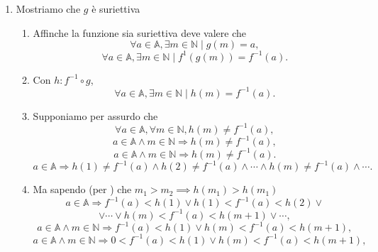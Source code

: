\begin{demonstration}
\begin{enumerate}[label=(\roman*)]
        \item Mostriamo che $g$ è suriettiva
        \begin{enumerate}[label=\arabic*.]
            \item Affinche la funzione sia suriettiva deve valere che
                \[ \forall a\in\mathbb{A}, \exists m\in\mathbb{N}\mid g\left(m\right)=a, \]
                \[ \forall a\in\mathbb{A}, \exists m\in\mathbb{N}\mid f^{1}\left(g\left(m\right)\right)=f^{-1}\left(a\right). \]
                \item Con $h: f^{-1} \circ g$,
                \[ \forall a\in\mathbb{A}, \exists m\in\mathbb{N}\mid h\left(m\right) = f^{-1}\left(a\right). \]
            \item Supponiamo per assurdo che
                \[ \forall a\in\mathbb{A}, \forall m\in\mathbb{N}, h\left(m\right) \neq f^{-1}\left(a\right), \]
                \[ a\in\mathbb{A} \land m\in\mathbb{N} \Rightarrow h\left(m\right) \neq f^{-1}\left(a\right), \]
                \[ a\in\mathbb{A} \land m\in\mathbb{N} \Rightarrow h\left(m\right) \neq f^{-1}\left(a\right). \]
                \[ a\in\mathbb{A} \Rightarrow h\left(1\right) \neq f^{-1}\left(a\right) \land h\left(2\right) \neq f^{-1}\left(a\right) \land \dotsm \land h\left(m\right) \neq f^{-1}\left(a\right) \land \dotsm . \]
            \item Ma sapendo (per ) che $m_1 > m_2 \implies h\left(m_1\right) > h\left(m_1\right)$
                \[ a\in\mathbb{A} \Rightarrow f^{-1}\left(a\right) < h\left(1\right) \lor h\left(1\right) < f^{-1}\left(a\right) < h\left(2\right) \lor \]
                \[\lor \dotsm \lor h\left(m\right) < f^{-1}\left(a\right) < h\left(m+1\right) \lor \dotsm, \]
                \[ a\in\mathbb{A} \land m\in\mathbb{N} \Rightarrow f^{-1}\left(a\right) < h\left(1\right) \lor h\left(m\right) < f^{-1}\left(a\right) < h\left(m+1\right), \]
                \[ a\in\mathbb{A} \land m\in\mathbb{N} \Rightarrow 0<f^{-1}\left(a\right) < h\left(1\right) \lor h\left(m\right) < f^{-1}\left(a\right) < h\left(m+1\right), \]


\end{enumerate}
\end{enumerate}
\end{demonstration}
